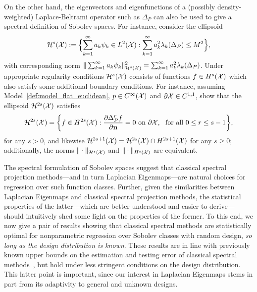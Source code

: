 On the other hand, the eigenvectors and eigenfunctions of a (possibly density-weighted) Laplace-Beltrami operator such as $\Delta_P$ can also be used to give a spectral definition of Sobolev spaces. For instance, consider the ellipsoid
\begin{equation}
\label{eqn:sobolev_ellipsoid}
\mathcal{H}^{s}(\mathcal{X}) := \Bigl\{\sum_{k = 1}^{\infty} a_k \psi_k \in L^2(\mathcal{X}):  \sum_{k = 1}^{\infty} a_k^2 \lambda_{k}(\Delta_P) \leq M^2 \Bigr\},
\end{equation}
with corresponding norm $\|\sum_{k = 1}^{\infty} a_k \psi_k\|_{\mathcal{H}^s(\mathcal{X})}^2 = \sum_{k = 1}^{\infty} a_k^2 \lambda_{k}(\Delta_P)$. Under appropriate regularity conditions $\mathcal{H}^s(\mathcal{X})$ consists of functions $f \in H^s(\mathcal{X})$ which also satisfy some additional boundary conditions. For instance, assuming Model~\ref{def:model_flat_euclidean}, $p \in C^{\infty}(\mathcal{X})$ and $\partial \mathcal{X} \in C^{1,1}$, \citet{dunlop2020} show that the ellipsoid $\mathcal{H}^{2s}(\mathcal{X})$ satisfies
\begin{equation}
\label{eqn:sobolev_ellipsoid_to_sobolev_ball}
\mathcal{H}^{2s}(\mathcal{X}) = 
\biggl\{f \in H^{2s}(\mathcal{X}): \frac{\partial \Delta_P^rf}{\partial {\bf n}} = 0~\textrm{on}~\partial\mathcal{X},~~\textrm{for all $0 \leq r \leq s - 1$} \biggr\},
\end{equation}
for any $s > 0$, and likewise $\mathcal{H}^{2s + 1}(\mathcal{X}) = \mathcal{H}^{2s}(\mathcal{X}) \cap H^{2s + 1}(\mathcal{X})$ for any $s \geq 0$; additionally, the norms $\|\cdot\|_{\mathcal{H}^s(\mathcal{X})}$ and $\|\cdot\|_{H^s(\mathcal{X})}$ are equivalent.

The spectral formulation of Sobolev spaces suggest that classical spectral projection methods---and in turn Laplacian Eigenmaps---are natural choices for regression over such function classes. Further, given the similarities between Laplacian Eigenmaps and classical spectral projection methods, the statistical properties of the latter---which are better understood and easier to derive---should intuitively shed some light on the properties of the former. To this end, we now give a pair of results showing that classical spectral methods are statistically optimal for nonparametric regression over Sobolev classes with random design, \emph{so long as the design distribution is known}. These results are in line with previously known upper bounds on the estimation and testing error of classical spectral methods~\citep{tsybakov08,ingster2009}, but hold under less stringent conditions on the design distribution. This latter point is important, since our interest in Laplacian Eigenmaps stems in part from its adaptivity to general and unknown designs.

